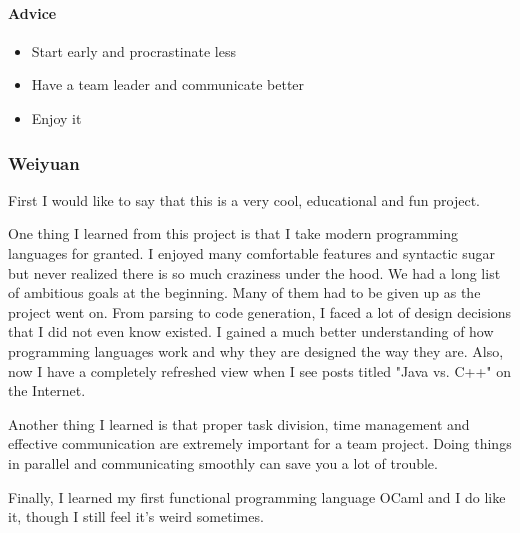 \paragraph{Advice}
\begin{itemize}
  \item Start early and procrastinate less
  \item Have a team leader and communicate better
  \item Enjoy it
\end{itemize}


\subsubsection*{Weiyuan}
First I would like to say that this is a very cool, educational and fun project. 

One thing I learned from this project is that I take modern programming languages for granted. I enjoyed many comfortable features and syntactic sugar but never realized there is so much craziness under the hood. We had a long list of ambitious goals at the beginning. Many of them had to be given up as the project went on. From parsing to code generation, I faced a lot of design decisions that I did not even know existed. I gained a much better understanding of how programming languages work and why they are designed the way they are. Also, now I have a completely refreshed view when I see posts titled "Java vs. C++" on the Internet.

Another thing I learned is that proper task division, time management and effective communication are extremely important for a team project. Doing things in parallel and communicating smoothly can save you a lot of trouble.

Finally, I learned my first functional programming language OCaml and I do like it, though I still feel it's weird sometimes.